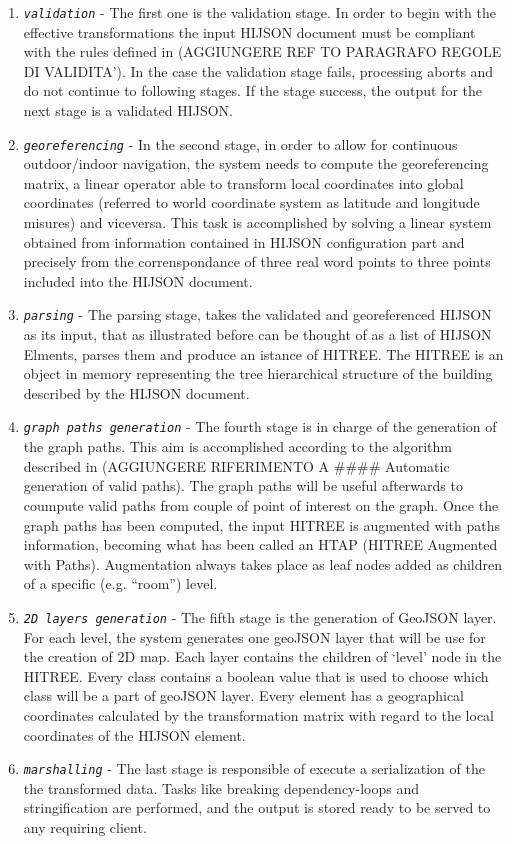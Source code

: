 \documentclass{sig-alternate}
\begin{document}
\begin{enumerate}
\def\labelenumi{\arabic{enumi}.}
\itemsep1pt\parskip0pt
\item
  \textit{\texttt{validation}} - The first one is the validation stage. In order to begin with the effective transformations the input HIJSON document must be compliant with the rules defined in (AGGIUNGERE REF TO PARAGRAFO REGOLE DI VALIDITA'). In the case the validation stage fails, processing aborts and do not continue to following stages. If the stage success, the output for the next stage is a validated HIJSON.
\item
  \textit{\texttt{georeferencing}} - In the second stage, in order to allow for continuous outdoor/indoor navigation, the system needs to compute the georeferencing matrix, a linear operator able to transform local coordinates into global coordinates (referred to world coordinate system as latitude and longitude misures) and viceversa. This task is accomplished by solving a linear system obtained from information contained in HIJSON configuration part and precisely from the correnspondance of three real word points to three points included into the HIJSON document.
\item
  \textit{\texttt{parsing}} - The parsing stage, takes the validated and georeferenced HIJSON as its input, that as illustrated before can be thought of as a list of HIJSON Elments, parses them and produce an istance of HITREE. The HITREE is an object in memory representing the tree hierarchical structure of the building described by the HIJSON document.
\item
  \textit{\texttt{graph paths generation}} - The fourth stage is in charge of the generation of the graph paths. This aim is accomplished according to the algorithm described in (AGGIUNGERE RIFERIMENTO A \#\#\#\# Automatic generation of valid paths). The graph paths will be useful afterwards to coumpute valid paths from couple of point of interest on the graph. Once the graph paths has been computed, the input HITREE is augmented with paths information, becoming what has been called an HTAP (HITREE Augmented with Paths). Augmentation always takes place as leaf nodes added as children of a specific (e.g. ``room'') level.
\item
  \textit{\texttt{2D layers generation}} - The fifth stage is the generation of GeoJSON layer. For each level, the system generates one geoJSON layer that will be use for the creation of 2D map. Each layer contains the children of `level' node in the HITREE. Every class contains a boolean value that is used to choose which class will be a part of geoJSON layer. Every element has a geographical coordinates calculated by the transformation matrix with regard to the local coordinates of the HIJSON element.
\item
  \textit{\texttt{marshalling}} - The last stage is responsible of execute a serialization of the the transformed data. Tasks like breaking dependency-loops and stringification are performed, and the output is stored ready to be served to any requiring client.
\end{enumerate}
\end{document}

